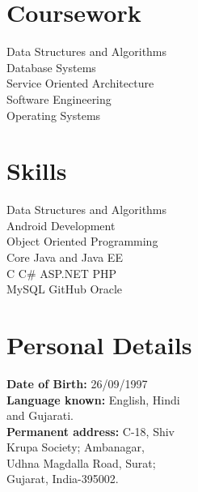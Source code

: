 \documentclass[]{denish-resume-openfont}
\begin{document}
\begin{minipage}[t]{0.3\textwidth}

\section{Coursework}
\textbullet{} Data Structures and Algorithms\\
\textbullet{} Database Systems \\
\textbullet{} Service Oriented Architecture \\
\textbullet{} Software Engineering \\
\textbullet{} Operating Systems \\
\sectionsep


\section{Skills}

\textbullet{} Data Structures and Algorithms \\
\textbullet{} Android Development \\
\textbullet{} Object Oriented Programming \\
\textbullet{} Core Java and Java EE \\
\textbullet{} C \textbullet{} C\# \textbullet{} ASP.NET \textbullet{} PHP  \\ 
\textbullet{} MySQL \textbullet{} GitHub \textbullet{} Oracle\\
\sectionsep

\section{Personal Details}
\textbullet{} \textbf{Date of Birth:} 26/09/1997 \\
\textbullet{} \textbf{Language known:} English, Hindi\\ \hspace{3mm} and Gujarati.\\
\textbullet{} \textbf{Permanent address:} C-18, Shiv \\
\hspace{3mm} Krupa Society; Ambanagar, \\
\hspace{3mm} Udhna Magdalla Road, Surat; \\ \hspace{3mm} Gujarat, India-395002.
\sectionsep
%
%

\end{minipage}
\end{document}
